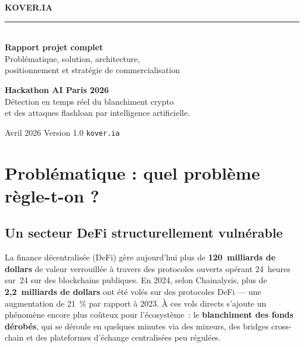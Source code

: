 \documentclass[11pt,a4paper]{article}
\begin{document}
\begin{titlepage}
\centering
\vspace*{2.5cm}
{\sffamily\Huge\bfseries\color{kvink} KOVER.IA}\\[0.2cm]
{\sffamily\Large\color{kvgold} \rule{4cm}{1pt}}\\[0.4cm]
{\sffamily\LARGE\bfseries Rapport projet complet}\\[0.6cm]
{\sffamily\large\color{kvgrey} Problématique, solution, architecture,\\[0.1cm]
positionnement et stratégie de commercialisation}\\[3.2cm]

\begin{tcolorbox}[
  enhanced, colback=kvbg, colframe=kvink,
  boxrule=0.5pt, arc=2pt, width=12cm,
  left=12pt, right=12pt, top=10pt, bottom=10pt,
  fontupper=\sffamily
]
\centering
\textbf{Hackathon AI Paris 2026}\\[0.4cm]
\small Détection en temps réel du blanchiment crypto\\
et des attaques flashloan par intelligence artificielle.
\end{tcolorbox}

\vfill
{\sffamily\color{kvgrey}\small Avril 2026 \quad\textbar\quad Version 1.0 \quad\textbar\quad \texttt{kover.ia}}
\end{titlepage}

\renewcommand{\contentsname}{Table des matières}
{\sffamily\tableofcontents}
\thispagestyle{fancy}
\newpage

\section{Problématique : quel problème règle-t-on ?}

\subsection{Un secteur DeFi structurellement vulnérable}

La finance décentralisée (DeFi) gère aujourd'hui plus de
\textbf{120~milliards de dollars} de valeur verrouillée à travers des
protocoles ouverts opérant 24~heures sur~24 sur des blockchains
publiques. En 2024, selon Chainalysis, plus de
\textbf{2,2~milliards de dollars} ont été volés sur des protocoles
DeFi --- une augmentation de 21~\% par rapport à 2023. À ces vols
directs s'ajoute un phénomène encore plus coûteux pour l'écosystème~:
le \textbf{blanchiment des fonds dérobés}, qui se déroule en quelques
minutes via des mixeurs, des bridges cross-chain et des plateformes
d'échange centralisées peu régulées.
\end{document}
